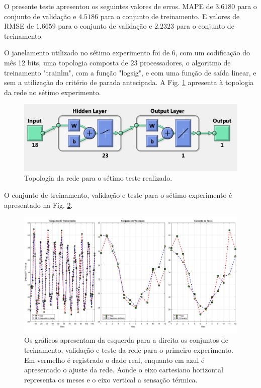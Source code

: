 \documentclass[journal, a4paper]{IEEEtran}
\begin{document}
O presente teste apresentou os seguintes valores de erros. MAPE de $3.6180$ para o conjunto de validação e $4.5186$ para o conjunto de treinamento. E valores de RMSE de $1.6659$ para o conjunto de validação e $2.2323$ para o conjunto de treinamento. 

O janelamento utilizado no sétimo experimento foi de 6, com um codificação do mês 12 bits, uma topologia composta de $23$ processadores, o algoritmo de treinamento "trainlm", com a função "logsig", e com uma função de saída linear, e sem a utilização do critério de parada antecipada. A Fig. \ref{topo7} apresenta à topologia da rede no sétimo experimento. 

\begin{figure}[H]
	\centering
	\includegraphics[scale=0.5]{Images/topologia7.jpg}
	\caption{Topologia da rede para o sétimo teste realizado.}
	\label{topo7}
\end{figure} 


O conjunto de treinamento, validação e teste para o sétimo experimento é apresentado na Fig. \ref{teste7}.

\begin{figure}[H]
	\centering
	\includegraphics[scale=0.15]{Images/Teste7.jpg}
	\caption{Os gráficos apresentam da esquerda para a direita os conjuntos de treinamento, validação e teste da rede para o primeiro experimento. Em vermelho é registrado o dado real, enquanto em azul é apresentado o ajuste da rede. Aonde o eixo cartesiano horizontal representa os meses e o eixo vertical a sensação térmica.}
	\label{teste7}
\end{figure} 
\end{document}
